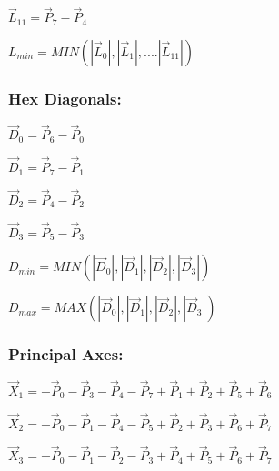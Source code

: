 \documentclass[12pt]{article}
\begin{document}
\begin{center}
$\vec L_{11} = \vec P_7 - \vec P_4 $
\end{center}

\begin{center}
$L_{min} = MIN\left(| \vec L_0 |,| \vec L_1|, .... |\vec L_{11}| \right) $
\end{center}

\subsubsection*{Hex Diagonals:}

\begin{center}
$\vec D_0 = \vec P_6 - \vec P_0 $
\end{center}

\begin{center}
$\vec D_1 = \vec P_7 - \vec P_1 $
\end{center}

\begin{center}
$\vec D_2 = \vec P_4 - \vec P_2 $
\end{center}

\begin{center}
$\vec D_3 = \vec P_5 - \vec P_3 $
\end{center}

\begin{center}
$D_{min} = MIN\left( | \vec D_0|, |\vec D_1|, |\vec D_2|, |\vec D_3| \right) $
\end{center}
\begin{center}
$D_{max} = MAX\left( | \vec D_0|, |\vec D_1|, |\vec D_2|, |\vec D_3| \right) $
\end{center}

\subsubsection*{Principal Axes:}

\begin{center}
$\vec X_1 = -\vec P_0 - \vec P_3 - \vec P_4 - \vec P_7 
            +\vec P_1 + \vec P_2 + \vec P_5 + \vec P_6$
\end{center}

\begin{center}
$\vec X_2 = -\vec P_0 - \vec P_1 - \vec P_4 - \vec P_5 
            +\vec P_2 + \vec P_3 + \vec P_6 + \vec P_7$
\end{center}

\begin{center}
$\vec X_3 = -\vec P_0 - \vec P_1 - \vec P_2 - \vec P_3 
            +\vec P_4 + \vec P_5 + \vec P_6 + \vec P_7$
\end{center}
\end{document}
